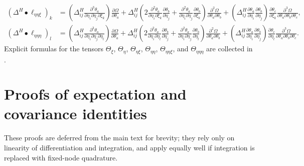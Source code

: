 \documentclass{article}
\begin{document}
%
\begin{align}
  (\Delta^H \bullet \ell_{\eta\eta\xi})_k  & = \left( \Delta^H_{ij} \tfrac{\partial^3 \theta_a}{\partial \eta_i \partial \eta_j \partial \xi_k} \right) \tfrac{\partial \Omega}{\partial \theta_a} + \Delta^H_{ij} \left( 2 \tfrac{\partial^2 \theta_a}{\partial \eta_i \partial \xi_k} \tfrac{\partial \theta_b}{\partial \eta_j} + \tfrac{\partial^2 \theta_a}{\partial \eta_i \partial \eta_j} \tfrac{\partial \theta_b}{\partial \xi_k} \right) \tfrac{\partial^2 \Omega}{\partial \theta_a \partial \theta_b} + \left( \Delta^H_{ij} \tfrac{\partial \theta_a}{\partial \eta_i} \tfrac{\partial \theta_b}{\partial \eta_j} \right) \tfrac{\partial \theta_c}{\partial \xi_k} \tfrac{\partial^3 \Omega}{\partial \theta_a \partial \theta_b \partial \theta_c}, \label{eq:third-derivative-ell-eta-eta-xi-delta-h}      \\
  (\Delta^H \bullet \ell_{\eta\eta\eta})_l & = \left( \Delta^H_{ij} \tfrac{\partial^3 \theta_a}{\partial \eta_i \partial \eta_j \partial \eta_l} \right) \tfrac{\partial \Omega}{\partial \theta_a} + \Delta^H_{ij} \left( 2 \tfrac{\partial^2 \theta_a}{\partial \eta_i \partial \eta_l} \tfrac{\partial \theta_b}{\partial \eta_j} + \tfrac{\partial^2 \theta_a}{\partial \eta_i \partial \eta_j} \tfrac{\partial \theta_b}{\partial \eta_l} \right) \tfrac{\partial^2 \Omega}{\partial \theta_a \partial \theta_b} + \left( \Delta^H_{ij} \tfrac{\partial \theta_a}{\partial \eta_i} \tfrac{\partial \theta_b}{\partial \eta_j} \right) \tfrac{\partial \theta_c}{\partial \eta_l} \tfrac{\partial^3 \Omega}{\partial \theta_a \partial \theta_b \partial \theta_c}. \label{eq:third-derivative-ell-eta-eta-eta-delta-h}
\end{align}
%
Explicit formulas for the tensors $\Theta_{\xi}$, $\Theta_{\eta}$, $\Theta_{\eta\xi}$, $\Theta_{\eta\eta}$, $\Theta_{\eta\eta\xi}$, and $\Theta_{\eta\eta\eta}$ are collected in .




\appendix

\section{Proofs of expectation and covariance identities}\label{app:proofs-expectation-covariance}

These proofs are deferred from the main text for brevity;
they rely only on linearity of differentiation and integration, and apply equally well if integration is replaced with fixed-node quadrature.
\end{document}
